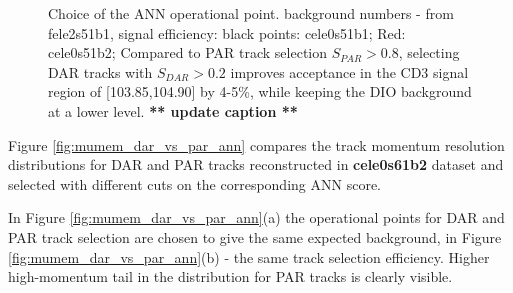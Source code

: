 \begin{figure}[H]
\caption{
  \label{fig:mumem_ann_operational_point_choice}
  Choice of the ANN operational point. background numbers - from fele2s51b1,
  signal efficiency: black points: cele0s51b1; Red: cele0s51b2;
  Compared to PAR track selection $S_{PAR} > 0.8$, selecting DAR tracks with $S_{DAR} > 0.2$ 
  improves acceptance in the CD3 signal region of [103.85,104.90] by 4-5\%, 
  while keeping the DIO background at a lower level.
  {\color{red} {\bf *** update caption **}}
}
\end{figure}

Figure \ref{fig:mumem_dar_vs_par_ann} compares the track momentum resolution distributions 
for DAR and PAR tracks reconstructed in {\bf cele0s61b2} dataset and selected with different
cuts on the corresponding ANN score.

In Figure \ref{fig:mumem_dar_vs_par_ann}(a) the operational points for DAR and PAR track selection
are chosen to give the same expected background, in Figure \ref{fig:mumem_dar_vs_par_ann}(b) -
the same track selection efficiency. Higher high-momentum tail in the distribution for PAR
tracks is clearly visible.

